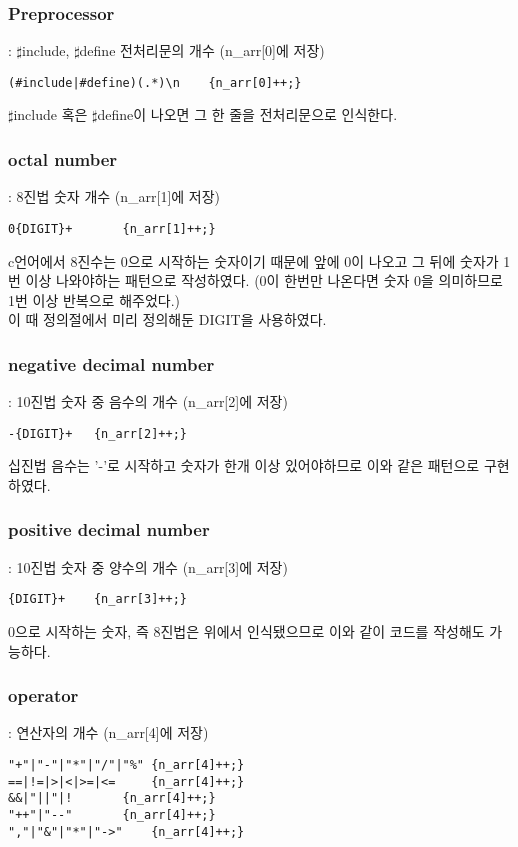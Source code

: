\documentclass{article}
\begin{document}
	 \subsubsection{Preprocessor} : $\sharp$include, $\sharp$define 전처리문의 개수 (n\_arr[0]에 저장)
	\begin{lstlisting}
(#include|#define)(.*)\n	{n_arr[0]++;}
	\end{lstlisting}
	$\sharp$include 혹은 $\sharp$define이 나오면 그 한 줄을 전처리문으로 인식한다.
	\\
	\subsubsection{octal number} : 8진법 숫자 개수 (n\_arr[1]에 저장)
	\begin{lstlisting}
0{DIGIT}+		{n_arr[1]++;}
	\end{lstlisting}
	c언어에서 8진수는 0으로 시작하는 숫자이기 때문에 앞에 0이 나오고 그 뒤에 숫자가 1번 이상 나와야하는 패턴으로 작성하였다. (0이 한번만 나온다면 숫자 0을 의미하므로 1번 이상 반복으로 해주었다.) \\
	이 때 정의절에서 미리 정의해둔 DIGIT을 사용하였다.
	\\
	\subsubsection{negative decimal number} : 10진법 숫자 중 음수의 개수 (n\_arr[2]에 저장)
	\begin{lstlisting}
-{DIGIT}+	{n_arr[2]++;}
	\end{lstlisting}
	십진법 음수는 '-'로 시작하고 숫자가 한개 이상 있어야하므로 이와 같은 패턴으로 구현하였다.
	\\
	\subsubsection{positive decimal number} : 10진법 숫자 중 양수의 개수 (n\_arr[3]에 저장)
	\begin{lstlisting}
{DIGIT}+	{n_arr[3]++;}
	\end{lstlisting}
	0으로 시작하는 숫자, 즉 8진법은 위에서 인식됐으므로 이와 같이 코드를 작성해도 가능하다.
	\\
	\subsubsection{operator} : 연산자의 개수 (n\_arr[4]에 저장)
	\begin{lstlisting}
"+"|"-"|"*"|"/"|"%"	{n_arr[4]++;}
==|!=|>|<|>=|<=		{n_arr[4]++;}
&&|"||"|!		{n_arr[4]++;}
"++"|"--"		{n_arr[4]++;}
","|"&"|"*"|"->"	{n_arr[4]++;}
	\end{lstlisting}
\end{document}
